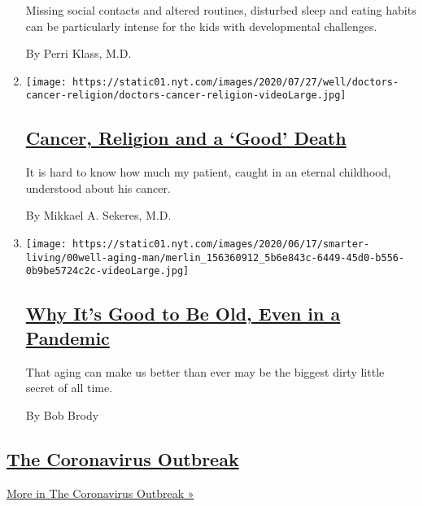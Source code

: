 \begin{enumerate}
  Missing social contacts and altered routines, disturbed sleep and
  eating habits can be particularly intense for the kids with
  developmental challenges.

  By Perri Klass, M.D.
\item
  \texttt{[image: https://static01.nyt.com/images/2020/07/27/well/doctors-cancer-religion/doctors-cancer-religion-videoLarge.jpg]}

  \hypertarget{cancer-religion-and-a-good-death}{%
  \subsection{\texorpdfstring{\href{/2020/07/28/well/live/cancer-religion-and-a-good-death.html}{Cancer,
  Religion and a `Good'
  Death}}{Cancer, Religion and a `Good' Death}}\label{cancer-religion-and-a-good-death}}

  It is hard to know how much my patient, caught in an eternal
  childhood, understood about his cancer.

  By Mikkael A. Sekeres, M.D.
\item
  \texttt{[image: https://static01.nyt.com/images/2020/06/17/smarter-living/00well-aging-man/merlin\_156360912\_5b6e843c-6449-45d0-b556-0b9be5724c2c-videoLarge.jpg]}

  \hypertarget{why-its-good-to-be-old-even-in-a-pandemic}{%
  \subsection{\texorpdfstring{\href{/2020/07/28/well/live/aging-benefits-pandemic.html}{Why
  It's Good to Be Old, Even in a
  Pandemic}}{Why It's Good to Be Old, Even in a Pandemic}}\label{why-its-good-to-be-old-even-in-a-pandemic}}

  That aging can make us better than ever may be the biggest dirty
  little secret of all time.

  By Bob Brody
\end{enumerate}

\hypertarget{the-coronavirus-outbreak}{%
\subsection{\texorpdfstring{\href{/news-event/coronavirus}{The
Coronavirus
Outbreak}}{The Coronavirus Outbreak}}\label{the-coronavirus-outbreak}}

\href{/news-event/coronavirus}{More in The Coronavirus Outbreak »}

